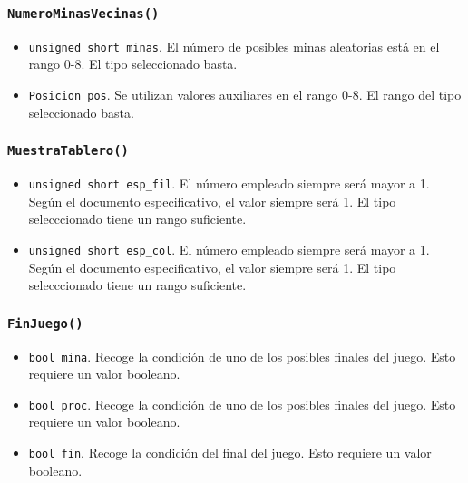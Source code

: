\documentclass[12pt]{article}
\begin{document}
\subsubsection*{\texttt{NumeroMinasVecinas()}}

\begin{itemize}

\item \texttt{unsigned short minas}. El número de posibles minas
aleatorias está en el rango 0-8. El tipo seleccionado basta.

\item \texttt{Posicion pos}. Se utilizan valores auxiliares en el rango
0-8. El rango del tipo seleccionado basta.

\end{itemize}

\subsubsection*{\texttt{MuestraTablero()}}

\begin{itemize}

\item \texttt{unsigned short esp_fil}. El número empleado siempre será
mayor a 1. Según el documento especificativo, el valor siempre será 1. El tipo
selecccionado tiene un rango suficiente.

\item \texttt{unsigned short esp_col}. El número empleado siempre será
mayor a 1. Según el documento especificativo, el valor siempre será 1. El tipo
selecccionado tiene un rango suficiente.

\end{itemize}

\subsubsection*{\texttt{FinJuego()}}

\begin{itemize}

\item \texttt{bool mina}. Recoge la condición de uno de los posibles
finales del juego. Esto requiere un valor booleano.

\item \texttt{bool proc}. Recoge la condición de uno de los posibles
finales del juego. Esto requiere un valor booleano.

\item \texttt{bool fin}. Recoge la condición del final del juego. Esto
requiere un valor booleano.

\end{itemize}
\end{document}
